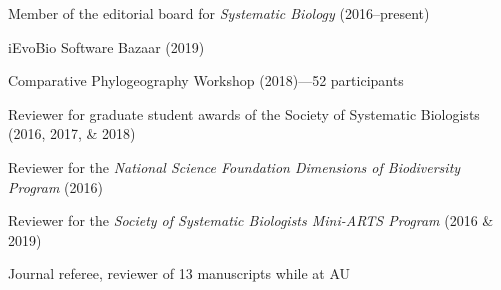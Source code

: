 \begin{veryTightItemize}
    \item Member of the editorial board for \emph{Systematic Biology}
        (2016--present)
    \item iEvoBio Software Bazaar (2019)
    \item Comparative Phylogeography Workshop (2018)---52 participants
    \item Reviewer for graduate student awards of the Society of Systematic
        Biologists (2016, 2017, \& 2018)
    \item Reviewer for the \emph{National Science Foundation Dimensions of
            Biodiversity Program} (2016)
    \item Reviewer for the \emph{Society of Systematic Biologists Mini-ARTS
            Program} (2016 \& 2019)
    \item Journal referee, reviewer of 13 manuscripts while at AU
\end{veryTightItemize}
